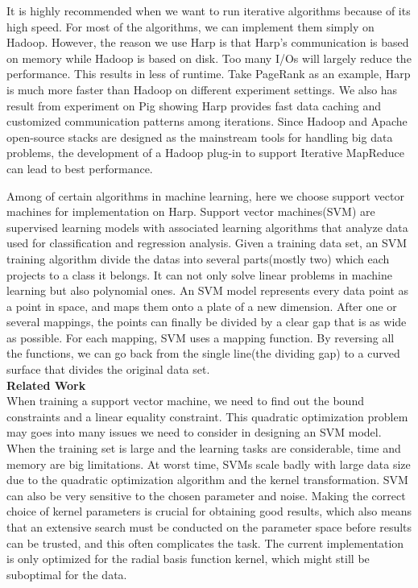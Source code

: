 It is highly recommended when we want to run iterative algorithms because of its high speed. For most of the algorithms, we can implement them simply on Hadoop. However, the reason we use Harp is that Harp's communication is based on memory while Hadoop is based on disk. Too many I/Os will largely reduce the performance. This results in less of runtime. Take PageRank as an example, Harp is much more faster than Hadoop on different experiment settings. We also has result from experiment on Pig showing Harp provides fast data caching and customized communication patterns among iterations\cite{wu2014integrating}. Since Hadoop and Apache open-source stacks are designed as the mainstream tools for handling big data problems, the development of a Hadoop plug-in to support Iterative MapReduce can lead to best performance.

Among of certain algorithms in machine learning, here we choose support vector machines for implementation on Harp. Support vector machines(SVM) are supervised learning models with associated learning algorithms that analyze data used for classification and regression analysis. Given a training data set, an SVM training algorithm divide the datas into several parts(mostly two) which each projects to a class it belongs. It can not only solve linear problems in machine learning but also polynomial ones. An SVM model represents every data point as a point in space, and maps them onto a plate of a new dimension. After one or several mappings, the points can finally be divided by a clear gap that is as wide as possible. For each mapping, SVM uses a mapping function. By reversing all the functions, we can go back from the single line(the dividing gap) to a curved surface that divides the original data set.\\

\textbf{Related Work}\\
When training a support vector machine, we need to find out the bound constraints and a linear equality constraint. This quadratic optimization problem may goes into many issues we need to consider in designing an SVM model\cite{joachims1999making}. When the training set is large and the learning tasks are considerable, time and memory are big limitations.  At worst time, SVMs scale badly with large data size due to the quadratic optimization algorithm and the kernel transformation\cite{meyer2015support}. SVM can also be very sensitive to the chosen parameter and noise. Making the correct choice of kernel parameters is crucial for obtaining good results, which also means that an extensive search must be conducted on the parameter space before results can be trusted, and this often complicates the task. The current implementation is only optimized for the radial basis function kernel, which might still be suboptimal for the data.

